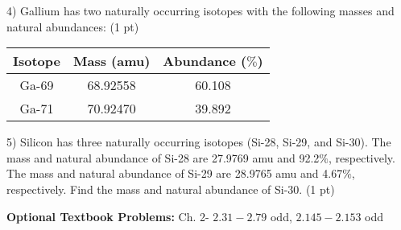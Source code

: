 \documentclass[12pt]{article}
\begin{document}
\vspace{1in}

4) Gallium has two naturally occurring isotopes with the following masses and
natural abundances: (1 pt)
\begin{table}[H]
  \begin{tabular}{ccc}
    Isotope & Mass (amu) & Abundance ($\%$) \\
    \hline
    Ga-69 & 68.92558 & 60.108 \\
    Ga-71 & 70.92470 & 39.892
  \end{tabular}
\end{table}

\vspace{1in}

5) Silicon has three naturally occurring isotopes (Si-28, Si-29, and Si-30).
The mass and natural abundance of Si-28 are 27.9769 amu and 92.2$\%$, respectively.
The mass and natural abundance of Si-29 are 28.9765 amu and 4.67$\%$, respectively.
Find the mass and natural abundance of Si-30. (1 pt)


\vfill

\textbf{Optional Textbook Problems:} Ch. 2- $2.31-2.79$ odd, $2.145-2.153$ odd
\end{document}
